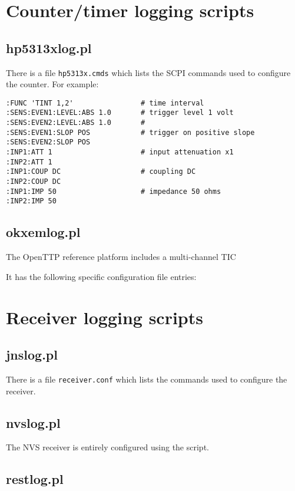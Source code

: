 \documentclass[11pt,a4paper,openany,oneside]{book}
\newcommand{\cc}[1]{{\small\texttt{#1}}}
\begin{document}


\section{Counter/timer logging scripts}

\subsection{hp5313xlog.pl}

There is a file \cc{hp5313x.cmds} which lists the SCPI commands used to configure the counter.
For example:
\begin{lstlisting}
:FUNC 'TINT 1,2'                # time interval
:SENS:EVEN1:LEVEL:ABS 1.0       # trigger level 1 volt
:SENS:EVEN2:LEVEL:ABS 1.0       #
:SENS:EVEN1:SLOP POS            # trigger on positive slope
:SENS:EVEN2:SLOP POS
:INP1:ATT 1                     # input attenuation x1
:INP2:ATT 1
:INP1:COUP DC                   # coupling DC
:INP2:COUP DC
:INP1:IMP 50                    # impedance 50 ohms
:INP2:IMP 50
\end{lstlisting}

\subsection{okxemlog.pl}

The OpenTTP reference platform includes a multi-channel TIC

It has the following specific configuration file entries:

\section{Receiver logging scripts}

\subsection{jnslog.pl}

There is a file \cc{receiver.conf} which lists the commands used to configure the receiver.

\subsection{nvslog.pl}

The NVS receiver is entirely configured using the script.

\subsection{restlog.pl}
\end{document}
